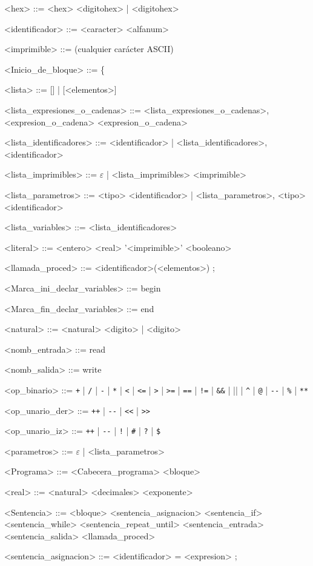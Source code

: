 \begin{grammar}
<hex> ::= <hex> <digitohex> | <digitohex>

<identificador> ::= <caracter> <alfanum>

<imprimible> ::= (cualquier carácter ASCII)

<Inicio_de_bloque> ::= \{

<lista> ::= [] | [<elementos>]

<lista_expresiones_o_cadenas> ::= <lista_expresiones_o_cadenas>, <expresion_o_cadena>
\alt <expresion_o_cadena>

<lista_identificadores> ::= <identificador> | <lista_identificadores>, <identificador>

<lista_imprimibles> ::= $\varepsilon$ | <lista_imprimibles> <imprimible>

<lista_parametros> ::= <tipo> <identificador> | <lista_parametros>, <tipo> <identificador>

<lista_variables> ::= <lista_identificadores>

<literal> ::= <entero>
\alt <real>
\alt '<imprimible>'
\alt <booleano>

<llamada_proced> ::= <identificador>(<elementos>) ;

<Marca_ini_declar_variables> ::= begin

<Marca_fin_declar_variables> ::= end

<natural> ::= <natural> <digito> | <digito>

<nomb_entrada> ::= read

<nomb_salida> ::= write

<op_binario> ::= \verb|+| | \verb|/| | \verb|-| | \verb|*| | \verb|<| | \verb|<=| | \verb|>| | \verb|>=| | \verb|==| | \verb|!=| | \verb|&&| | \verb|||| | \verb|^| | \verb|@| | \verb|--| | \verb|%| | \verb|**|

<op_unario_der> ::= \verb|++| | \verb|--| | \verb|<<| | \verb|>>|

<op_unario_iz> ::= \verb|++| | \verb|--| | \verb|!| | \verb|#| | \verb|?| | \verb|$|

<parametros> ::= $\varepsilon$ | <lista_parametros>

<Programa> ::= <Cabecera_programa> <bloque>

<real> ::= <natural> <decimales> <exponente>

<Sentencia> ::= <bloque>
\alt <sentencia_asignacion>
\alt <sentencia_if>
\alt <sentencia_while>
\alt <sentencia_repeat_until>
\alt <sentencia_entrada>
\alt <sentencia_salida>
\alt <llamada_proced>

<sentencia_asignacion> ::=  <identificador> = <expresion> ;


\end{grammar}
